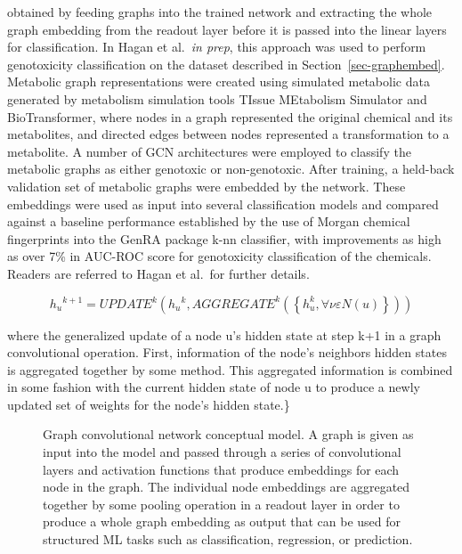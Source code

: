 \documentclass[
  super,
  preprint,
  3p]{elsarticle}
\begin{document}
obtained by feeding graphs into the trained network and extracting the
whole graph embedding from the readout layer before it is passed into
the linear layers for classification. In Hagan et al.~\emph{in prep},
this approach was used to perform genotoxicity classification on the
dataset described in Section~\ref{sec-graphembed}. Metabolic graph
representations were created using simulated metabolic data generated by
metabolism simulation tools TIssue MEtabolism Simulator
\citep{mekenyan_2004} and BioTransformer\citep{djoumbou_2019}, where
nodes in a graph represented the original chemical and its metabolites,
and directed edges between nodes represented a transformation to a
metabolite. A number of GCN architectures were employed to classify the
metabolic graphs as either genotoxic or non-genotoxic. After training, a
held-back validation set of metabolic graphs were embedded by the
network. These embeddings were used as input into several classification
models and compared against a baseline performance established by the
use of Morgan chemical fingerprints into the GenRA package k-nn
classifier, with improvements as high as over 7\% in AUC-ROC score for
genotoxicity classification of the chemicals. Readers are referred to
Hagan et al.~for further details.

\[ 
h_{u}{^{k+1}} = UPDATE{^k}(h_u{^k},AGGREGATE^k(\left\{ h_u^k, \forall \nu\varepsilon N(u)\right\}))
\]

where the generalized update of a node u's hidden state at step k+1 in a
graph convolutional operation. First, information of the node's
neighbors hidden states is aggregated together by some method. This
aggregated information is combined in some fashion with the current
hidden state of node u to produce a newly updated set of weights for the
node's hidden state.\}

\begin{figure}


\caption{\label{fig-gcn-concept}Graph convolutional network conceptual
model. A graph is given as input into the model and passed through a
series of convolutional layers and activation functions that produce
embeddings for each node in the graph. The individual node embeddings
are aggregated together by some pooling operation in a readout layer in
order to produce a whole graph embedding as output that can be used for
structured ML tasks such as classification, regression, or prediction.}

\end{figure}%
\end{document}
